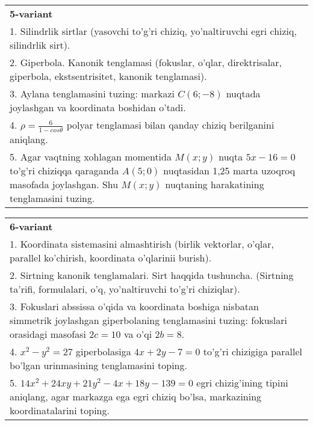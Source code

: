\documentclass{article}
\begin{document}
\begin{tabular}{m{17cm}}
\textbf{5-variant}\\
1. Silindrlik sirtlar (yasovchi to'g'ri chiziq, yo'naltiruvchi egri chiziq, silindrlik sirt).\\

2. Giperbola. Kanonik tenglamasi (fokuslar, o'qlar, direktrisalar, giperbola, ekstsentrisitet, kanonik tenglamasi).\\

3. Aylana tenglamasini tuzing: markazi $C(6;-8)$ nuqtada joylashgan va koordinata boshidan o'tadi.\\

4. $\rho = \frac{6}{1 - cos\theta}$ polyar tenglamasi bilan qanday chiziq berilganini aniqlang.  \\

5. Agar vaqtning xohlagan momentida $M(x;y)$ nuqta $5x - 16 = 0$ to'g'ri chiziqqa qaraganda $A(5;0)$ nuqtasidan 1,25 marta uzoqroq masofada joylashgan. Shu $M(x;y)$ nuqtaning harakatining tenglamasini tuzing.  
\end{tabular}
\vspace{1cm}


\begin{tabular}{m{17cm}}
\textbf{6-variant}\\
1. Koordinata sistemasini almashtirish (birlik vektorlar, o'qlar, parallel ko'chirish, koordinata o'qlarinii burish).\\

2. Sirtning kanonik tenglamalari. Sirt haqqida tushuncha. (Sirtning ta'rifi, formulalari, o'q, yo'naltiruvchi to'g'ri chiziqlar).\\

3. Fokuslari abssissa o'qida va koordinata boshiga nisbatan simmetrik joylashgan giperbolaning tenglamasini tuzing: fokuslari orasidagi masofasi $2c=10$ va o'qi $2b=8$.\\

4. $x^{2} - y^{2} = 27$ giperbolasiga $4x + 2y - 7 = 0$ to'g'ri chizigiga parallel bo'lgan urinmasining tenglamasini toping.  \\

5. $14x^{2} + 24xy + 21y^{2} - 4x + 18y - 139 = 0$ egri chizig'ining tipini aniqlang, agar markazga ega egri chiziq bo'lsa, markazining koordinatalarini toping.  
\end{tabular}
\vspace{1cm}
\end{document}
